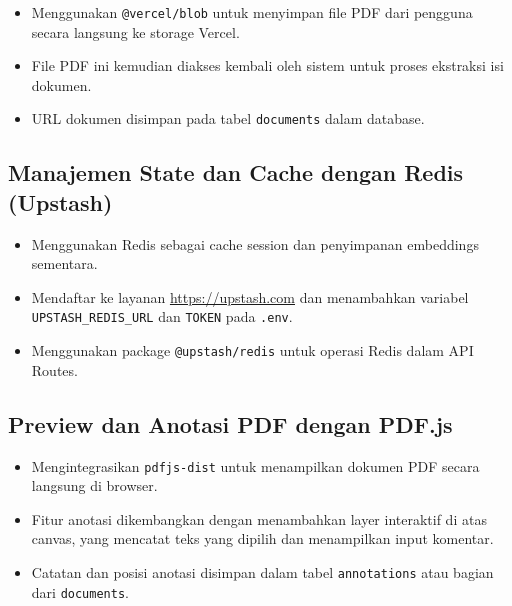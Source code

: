 \begin{itemize}
  \item Menggunakan \texttt{@vercel/blob} untuk menyimpan file PDF dari pengguna secara langsung ke storage Vercel.
  \item File PDF ini kemudian diakses kembali oleh sistem untuk proses ekstraksi isi dokumen.
  \item URL dokumen disimpan pada tabel \texttt{documents} dalam database.
\end{itemize}

\subsection{Manajemen State dan Cache dengan Redis (Upstash)}
\begin{itemize}
  \item Menggunakan Redis sebagai cache session dan penyimpanan embeddings sementara.
  \item Mendaftar ke layanan \url{https://upstash.com} dan menambahkan variabel \texttt{UPSTASH\_REDIS\_URL} dan \texttt{TOKEN} pada \texttt{.env}.
  \item Menggunakan package \texttt{@upstash/redis} untuk operasi Redis dalam API Routes.
\end{itemize}

\subsection{Preview dan Anotasi PDF dengan PDF.js}
\begin{itemize}
  \item Mengintegrasikan \texttt{pdfjs-dist} untuk menampilkan dokumen PDF secara langsung di browser.
  \item Fitur anotasi dikembangkan dengan menambahkan layer interaktif di atas canvas, yang mencatat teks yang dipilih dan menampilkan input komentar.
  \item Catatan dan posisi anotasi disimpan dalam tabel \texttt{annotations} atau bagian dari \texttt{documents}.
\end{itemize}
